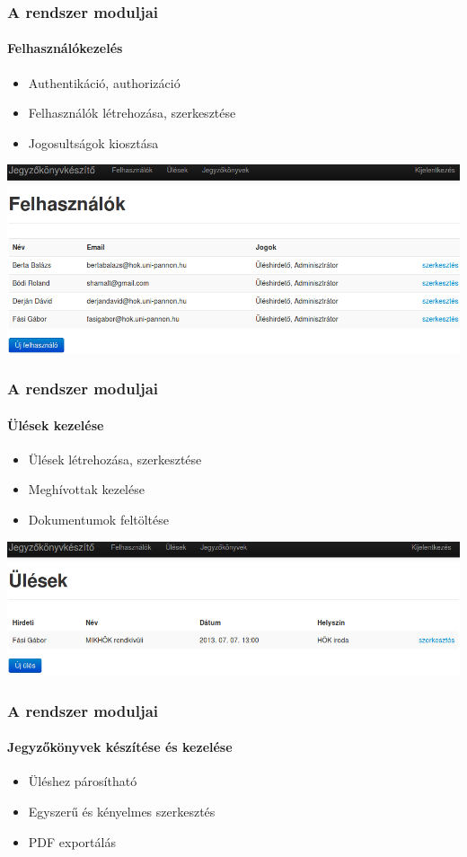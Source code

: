 \documentclass[12pt]{beamer}
\begin{document}
\begin{frame}
    \frametitle{A rendszer moduljai}
    \framesubtitle{Felhasználókezelés}
    
    \begin{itemize}
        \item Authentikáció, authorizáció
        \item Felhasználók létrehozása, szerkesztése
        \item Jogosultságok kiosztása
    \end{itemize}
    
    \includegraphics[width=\textwidth,center]{felhasznalolista.png}   
\end{frame}

\begin{frame}
    \frametitle{A rendszer moduljai}
    \framesubtitle{Ülések kezelése}
    
    \begin{itemize}
        \item Ülések létrehozása, szerkesztése
        \item Meghívottak kezelése
        \item Dokumentumok feltöltése
    \end{itemize}
    
    \includegraphics[width=\textwidth,center]{uleslista.png}
\end{frame}

\begin{frame}
    \frametitle{A rendszer moduljai}
    \framesubtitle{Jegyzőkönyvek készítése és kezelése}
    
    \Large
    \begin{itemize}
        \item Üléshez párosítható
        \item Egyszerű és kényelmes szerkesztés
        \item PDF exportálás
    \end{itemize}
\end{frame}
\end{document}
